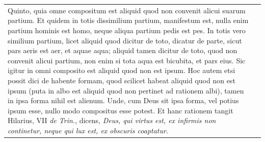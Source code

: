 \documentclass[paper=a4paper,fontsize=10pt,jafontsize=9pt,titlepage]{jlreq}
\begin{document}
\begin{longtable}{p{21em}p{21em}}
\\

Quinto, quia omne compositum est aliquid quod non convenit alicui suarum
 partium. Et quidem in totis dissimilium partium, manifestum est, nulla
 enim partium hominis est homo, neque aliqua partium pedis est pes. In
 totis vero similium partium, licet aliquid quod dicitur de toto,
 dicatur de parte, sicut pars aeris est aer, et aquae aqua; aliquid
 tamen dicitur de toto, quod non convenit alicui partium, non enim si
 tota aqua est bicubita, et pars eius. Sic igitur in omni composito est
 aliquid quod non est ipsum. Hoc autem etsi possit dici de habente
 formam, quod scilicet habeat aliquid quod non est ipsum (puta in albo
 est aliquid quod non pertinet ad rationem albi), tamen in ipsa forma
 nihil est alienum. Unde, cum Deus sit ipsa forma, vel potius ipsum
 esse, nullo modo compositus esse potest. Et hanc rationem tangit
 Hilarius, VII {\itshape de Trin.}, dicens, {\itshape Deus, qui virtus
 est, ex infirmis non continetur, neque qui lux est, ex obscuris
 coaptatur}.

&


\end{longtable}
\end{document}
